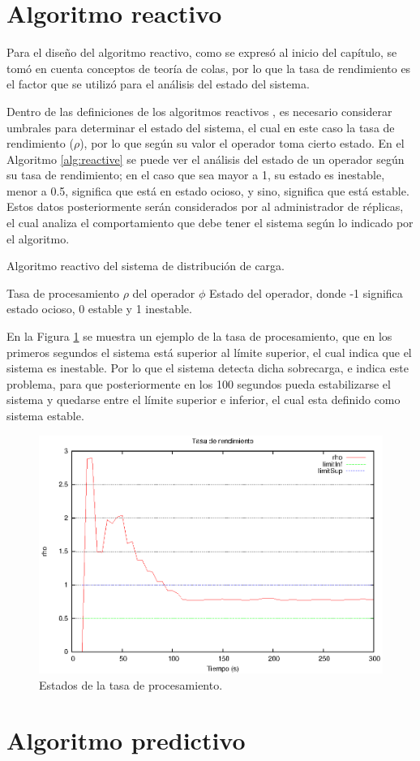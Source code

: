 \section{Algoritmo reactivo}
Para el diseño del algoritmo reactivo, como se expresó al inicio del capítulo, se tomó en cuenta conceptos de teoría de colas, por lo que la tasa de rendimiento es el factor que se utilizó para el análisis del estado del sistema.

Dentro de las definiciones de los algoritmos reactivos \citep{CasavantK88}, es necesario considerar umbrales para determinar el estado del sistema, el cual en este caso la tasa de rendimiento ($\rho$), por lo que según su valor el operador toma cierto estado. En el Algoritmo \ref{alg:reactive} se puede ver el análisis del estado de un operador según su tasa de rendimiento; en el caso que sea mayor a 1, su estado es inestable, menor a 0.5, significa que está en estado ocioso, y sino, significa que está estable. Estos datos posteriormente serán considerados por al administrador de réplicas, el cual analiza el comportamiento que debe tener el sistema según lo indicado por el algoritmo.

\begin{algorithm}[!ht]
	\caption{Algoritmo reactivo del sistema de distribución de carga.}
	\label{alg:reactive}
	\begin{algorithmic}[1]
	\REQUIRE Tasa de procesamiento $\rho$ del operador $\phi$ 
	\ENSURE Estado del operador, donde -1 significa estado ocioso, 0 estable y 1 inestable.
	\ELSE
	\ENDIF
	\end{algorithmic}
\end{algorithm}

En la Figura \ref{fig:umbrales} se muestra un ejemplo de la tasa de procesamiento, que en los primeros segundos el sistema está superior al límite superior, el cual indica que el sistema es inestable. Por lo que el sistema detecta dicha sobrecarga, e indica este problema, para que posteriormente en los 100 segundos pueda estabilizarse el sistema y quedarse entre el límite superior e inferior, el cual esta definido como sistema estable.

\begin{figure}[hb!]
  \centering
    \includegraphics[scale=0.75]{images/Umbrales.eps}
  \caption{Estados de la tasa de procesamiento.}
  \label{fig:umbrales}
\end{figure}


\section{Algoritmo predictivo}